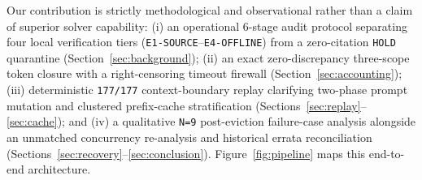 \documentclass[10pt]{article}
\newcommand{\code}[1]{\texttt{#1}}
\begin{document}
Our contribution is strictly methodological and observational rather than a claim of superior solver capability: (i) an operational 6-stage audit protocol separating four local verification tiers (\code{E1-SOURCE}--\code{E4-OFFLINE}) from a zero-citation \code{HOLD} quarantine (Section~\ref{sec:background}); (ii) an exact zero-discrepancy three-scope token closure with a right-censoring timeout firewall (Section~\ref{sec:accounting}); (iii) deterministic \code{177/177} context-boundary replay clarifying two-phase prompt mutation and clustered prefix-cache stratification (Sections~\ref{sec:replay}--\ref{sec:cache}); and (iv) a qualitative \code{N=9} post-eviction failure-case analysis alongside an unmatched concurrency re-analysis and historical errata reconciliation (Sections~\ref{sec:recovery}--\ref{sec:conclusion}). Figure~\ref{fig:pipeline} maps this end-to-end architecture.
\end{document}
